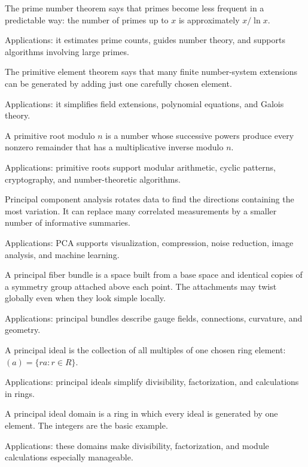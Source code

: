 The prime number theorem says that primes become less frequent in a predictable way: the number of primes up to $x$ is approximately $x/\ln x$. \par\noindent Applications: it estimates prime counts, guides number theory, and supports algorithms involving large primes.

The primitive element theorem says that many finite number-system extensions can be generated by adding just one carefully chosen element. \par\noindent Applications: it simplifies field extensions, polynomial equations, and Galois theory.

A primitive root modulo $n$ is a number whose successive powers produce every nonzero remainder that has a multiplicative inverse modulo $n$. \par\noindent Applications: primitive roots support modular arithmetic, cyclic patterns, cryptography, and number-theoretic algorithms.

Principal component analysis rotates data to find the directions containing the most variation. It can replace many correlated measurements by a smaller number of informative summaries. \par\noindent Applications: PCA supports visualization, compression, noise reduction, image analysis, and machine learning.

A principal fiber bundle is a space built from a base space and identical copies of a symmetry group attached above each point. The attachments may twist globally even when they look simple locally. \par\noindent Applications: principal bundles describe gauge fields, connections, curvature, and geometry.

A principal ideal is the collection of all multiples of one chosen ring element: $(a)=\{ra:r\in R\}$. \par\noindent Applications: principal ideals simplify divisibility, factorization, and calculations in rings.

A principal ideal domain is a ring in which every ideal is generated by one element. The integers are the basic example. \par\noindent Applications: these domains make divisibility, factorization, and module calculations especially manageable.

